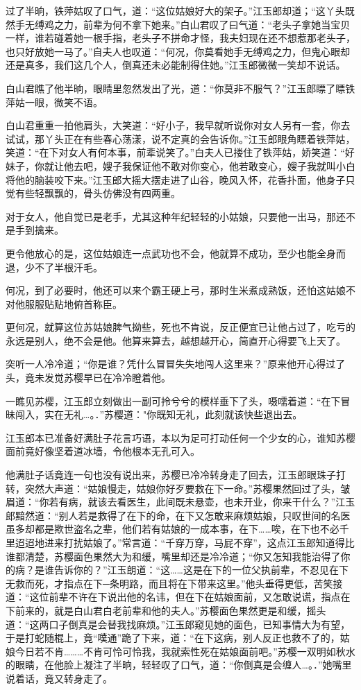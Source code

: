 \documentclass[12pt,oneside]{book}
\begin{document}
过了半晌，铁萍姑叹了口气，道：``这位姑娘好大的架子。''江玉郎却道；``这丫头既然手无缚鸡之力，前辈为何不拿下她来。''白山君叹了曰气道：``老头子拿她当宝贝一样，谁若碰着她一根手指，老头子不拼命才怪，我夫妇现在还不想惹那老头子，也只好放她一马了。''自夫人也叹道：``何况，你莫看她手无缚鸡之力，但鬼心眼却还是真多，我们这几个人，倒真还未必能制得住她。''江玉郎微微一笑却不说话。

白山君瞧了他半晌，眼睛里忽然发出了光，道：``你莫非不服气？''江玉郎瞟了瞟铁萍姑一眼，微笑不语。

白山君重重一拍他肩头，大笑道：``好小子，我早就听说你对女人另有一套，你去试试，那丫头正在有些春心荡漾，说不定真的会告诉你。''江玉郎眼角瞟着铁萍姑，笑道：``在下对女人有何本事，前辈说笑了。''白夫人已搂住了铁萍姑，娇笑道：``好妹子，你就让他去吧，嫂子我保证他不敢对你变心，他若敢变心，嫂子我就叫小白将他的脑装咬下来。''江玉郎大摇大摆走进了山谷，晚风入怀，花香扑面，他身子只觉有些轻飘飘的，骨头仿佛没有四两重。

对于女人，他自觉已是老手，尤其这种年纪轻轻的小姑娘，只要他一出马，那还不是手到擒来。

更令他放心的是，这位姑娘连一点武功也不会，他就算不成功，至少也能全身而退，少不了半根汗毛。

何况，到了必要时，他还可以来个霸王硬上弓，那时生米煮成熟饭，还怕这姑娘不对他服服贴贴地俯首称臣。

更何况，就算这位苏姑娘脾气拗些，死也不肯说，反正便宜已让他占过了，吃亏的永远是别人，绝不会是他。他算来算去，越想越开心，简直开心得要飞上天了。

突听一人冷冷道；``你是谁？凭什么冒冒失失地闯人这里来？''原来他开心得过了头，竟未发觉苏樱早已在冷冷瞪着他。

一瞧见苏樱，江玉郎立刻做出一副可拎兮兮的模样垂下了头，嗫嚅着道：``在下冒昧闯入，实在无礼\ldots。．''苏樱道："你既知无礼，此刻就该快些退出去。

江玉郎本已准备好满肚子花言巧语，本以为足可打动任何一个少女的心，谁知苏樱面前竟好像坚着道冰墙，令他根本无孔可入。

他满肚子话竟连一句也没有说出来，苏樱已冷冷转身走了回去，江玉郎眼珠子打转，突然大声道：``姑娘慢走，姑娘你好歹要救在下一命。''苏樱果然回过了头，皱眉道：``你若有病，就该去看医生，此间既未悬壶，也未开业，你来干什么？''江玉郎黯然道：``别人若是救得了在下的命，在下又怎敢来麻烦姑娘，只叹世间的名医虽多却都是欺世盗名之辈，他们若有姑娘的一成本事，在下\ldots\ldots 唉，在下也不必千里迢迢地进来打扰姑娘了。''常言道：``千穿万穿，马屁不穿''，这点江玉郎知道得比谁都清楚，苏樱面色果然大为和缓，嘴里却还是冷冷道；``你又怎知我能治得了你的病？是谁告诉你的？''江玉朗道：``这\ldots\ldots 这是在下的一位父执前辈，不忍见在下无救而死，才指点在下─条明路，而且将在下带来这里。''他头垂得更低，苦笑接道：``这位前辈不许在下说出他的名讳，但在下在姑娘面前，又怎敢说谎，指点在下前来的，就是白山君白老前辈和他的夫人。''苏樱面色果然更是和缓，摇头道：``这两口子倒真是会替我找麻烦。''江玉郎窥见她的面色，已知事情大为有望，于是打蛇随棍上，竟``噗通''跪了下来，道：``在下这病，别人反正也救不了的，姑娘今日若不肯\ldots\ldots\ldots 不肯可怜可怜我，我就索性死在姑娘面前吧。''苏樱一双明如秋水的眼睛，在他脸上凝注了半晌，轻轻叹了口气，道：``你倒真是会缠人\ldots。．''她嘴里说着话，竟又转身走了。
\end{document}
